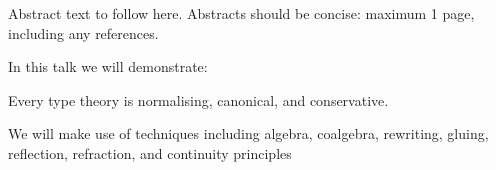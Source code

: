 \documentclass{sstt-2026-abstract}
\begin{document}

Abstract text to follow here. Abstracts should be concise: maximum 1 page, including any references.

In this talk we will demonstrate:

\begin{theorem*}
  Every type theory is normalising, canonical, and conservative.
\end{theorem*}

We will make use of techniques including algebra, coalgebra, rewriting, gluing, reflection, refraction, and continuity principles \cite{martin-lof:bibliopolis,cartmell:generalised-algebraic-theories}

\lipsum[3-4]

\printbibliography
\end{document}
